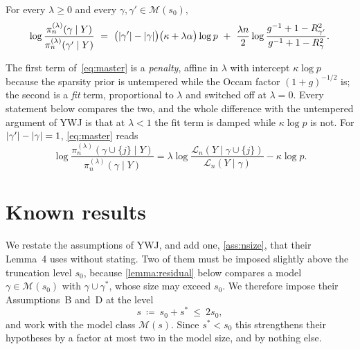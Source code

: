 \documentclass[aos]{imsart}
\DeclarePairedDelimiter{\abs}{\lvert}{\rvert}
\theoremstyle{plain}
\theoremstyle{definition}
\begin{document}
    For every $\lambda\geq0$ and every $\gamma,\gamma'\in\mathscr{M}(s_0)$,
    \begin{equation}
        \label{eq:master}
        \log\frac{\pi_n^{(\lambda)}(\gamma\mid Y)}
        {\pi_n^{(\lambda)}(\gamma'\mid Y)}
        \ =\ \bigl(\abs{\gamma'}-\abs{\gamma}\bigr)
        \bigl(\kappa+\lambda\alpha\bigr)\log p
        \ +\ \frac{\lambda n}{2}
        \log\frac{g^{-1}+1-R^{2}_{\gamma'}}
        {g^{-1}+1-R^{2}_{\gamma}} .
    \end{equation}


    The first term of~\eqref{eq:master} is a \emph{penalty}, affine in
    $\lambda$ with intercept $\kappa\log p$ because the sparsity prior is
    untempered while the Occam factor $(1+g)^{-1/2}$ is; the second is a
    \emph{fit} term, proportional to $\lambda$ and switched off at
    $\lambda=0$. Every statement below compares the two, and the whole
    difference with the untempered argument of YWJ is that at $\lambda<1$
    the fit term is damped while $\kappa\log p$ is not. For $\abs{\gamma'}-\abs{\gamma}=1$, \eqref{eq:master}
    reads
    \begin{equation}
        \label{eq:onestep}
        \log\frac{\pi_n^{(\lambda)}(\gamma\cup\{j\}\mid Y)}
        {\pi_n^{(\lambda)}(\gamma\mid Y)}
        =\lambda\log\frac{\mathcal{L}_n(Y\mid\gamma\cup\{j\})}
        {\mathcal{L}_n(Y\mid\gamma)}-\kappa\log p .
    \end{equation}




    \section{Known results}
    \label{sec:assumptions}

    We restate the assumptions of YWJ, and add one, \cref{ass:nsize}, that
    their Lemma~4 uses without stating. Two of them must be imposed slightly
    above the truncation level $s_0$, because \cref{lemma:residual} below
    compares a model $\gamma\in\mathscr{M}(s_0)$ with
    $\gamma\cup\gamma^{\ast}$, whose size may exceed $s_0$. We therefore
    impose their Assumptions~B and~D at the level
    \begin{equation}
        \label{eq:slevel}
        s\ \coloneq\ s_0+s^{\ast}\ \leq\ 2s_0 ,
    \end{equation}
    and work with the model class $\mathscr{M}(s)$. Since $s^{\ast}<s_0$ this
    strengthens their hypotheses by a factor at most two in the model size,
    and by nothing else.
\end{document}
